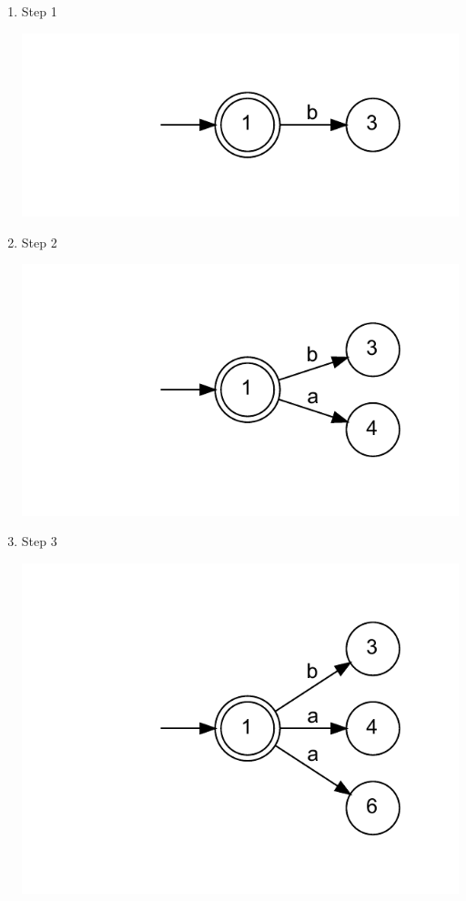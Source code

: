 \documentclass{article}
\begin{document}
\begin{enumerate}
\item Step 1
\begin{center}
\includegraphics[width=\textwidth]{step1.dot.pdf}
\end{center}
\item Step 2
\begin{center}
\includegraphics[width=\textwidth]{step2.dot.pdf}
\end{center}
\item Step 3
\begin{center}
\includegraphics[width=\textwidth]{step3.dot.pdf}

\end{center}
\end{enumerate}
\end{document}
